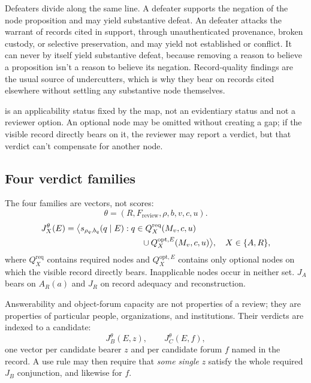 Defeaters divide along the same line. A  defeater supports the negation of the node proposition and may yield substantive defeat. An  defeater attacks the warrant of records cited in support, through unauthenticated provenance, broken custody, or selective preservation, and may yield not established or conflict. It can never by itself yield substantive defeat, because removing a reason to believe a proposition isn't a reason to believe its negation. Record-quality findings are the usual source of undercutters, which is why they bear on records cited elsewhere without settling any substantive node themselves.

 is an applicability status fixed by the map, not an evidentiary status and not a reviewer option. An optional node may be omitted without creating a gap; if the visible record directly bears on it, the reviewer may report a verdict, but that verdict can't compensate for another node.

\subsection{Four verdict families}

The four families are vectors, not scores:
\[
  \theta=(R,F_{\mathrm{review}},\rho,b,v,c,u).
\]
\[
  \begin{aligned}
  J_X^{\theta}(E)
    &= \big\langle s_{\rho_q,b_q}(q\mid E):
       q\in Q_X^{\mathrm{req}}(M_v,c,u) \\
    &\hspace{32mm}{}\cup Q_X^{\mathrm{opt},E}(M_v,c,u)\big\rangle,
       \quad X\in\{A,R\},
  \end{aligned}
\]
where \(Q_X^{\mathrm{req}}\) contains required nodes and \(Q_X^{\mathrm{opt},E}\) contains only optional nodes on which the visible record directly bears. Inapplicable nodes occur in neither set. \(J_A\) bears on \(A_R(a)\) and \(J_R\) on record adequacy and reconstruction.

Answerability and object-forum capacity are not properties of a review; they are properties of particular people, organizations, and institutions. Their verdicts are indexed to a candidate:
\[
  J_B^{\theta}(E,z), \qquad J_C^{\theta}(E,f),
\]
one vector per candidate bearer \(z\) and per candidate forum \(f\) named in the record. A use rule may then require that \emph{some single} \(z\) satisfy the whole required \(J_B\) conjunction, and likewise for \(f\).

